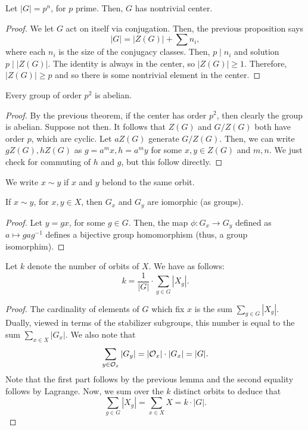 \begin{theorem}
    Let $|G| = p^n$, for $p$ prime. Then, $G$ has nontrivial center.
\end{theorem}
\begin{proof}
    We let $G$ act on itself via conjugation. Then, the previous proposition says
    \[
    |G| = |Z(G)| + \sum n_i,
    \]
    where each $n_i$ is the size of the conjugacy classes. Then, $p \mid n_i$ and solution
    $p \mid |Z(G)|$. The identity is always in the center, so $|Z(G)| \geq 1$. Therefore,
    $|Z(G)| \geq p$ and so there is some nontrivial element in the center.
\end{proof}

\begin{corollary}
    Every group of order $p^2$ is abelian.
\end{corollary}
\begin{proof}
    By the previous theorem, if the center has order $p^2$, then 
    clearly the group is abelian. Suppose not then.
    It follows that $Z(G)$ and $G/Z(G)$ both have order $p$, which
    are cyclic. Let $aZ(G)$ generate $G/Z(G)$. Then, we can write
    $gZ(G), hZ(G)$ as $g = a^mx, h=a^my$ for some $x,y \in Z(G)$ and $m,n$.
    We just check for commuting of $h$ and $g$, but this follow directly.
\end{proof}

\begin{nt}
We write $x \sim y$ if $x$ and $y$ belond to the same orbit.
\end{nt}

\begin{proposition}
    If $x \sim y$, for $x, y \in X$, then $G_x$ and $G_y$ are 
    iomorphic (as groups).
\end{proposition}
\begin{proof}
    Let $y = gx$, for some $g \in G$. Then, the map
    $\phi \colon G_x \rightarrow G_y$ defined as $a \mapsto gag^{-1}$
    defines a bijective group homomorphism (thus, a group isomorphim).
\end{proof}

\begin{theorem}
    Let $k$ denote the number of orbits of $X$. We have as follows:
    \[
    k = \frac{1}{|G|} \cdot \sum_{g \in G} |X_g|.
    \]
\end{theorem}
\begin{proof}
    The cardinality of elements of $G$ which fix $x$ is the sum $\sum_{g \in G} |X_g|$.
    Dually, viewed in terms of the stabilizer subgroups, this number is 
    equal to the sum $\sum_{x \in X} |G_x|$. We also note that
    \[
    \sum_{y \in \mathcal{O}_x} |G_y| = |\mathcal{O}_x| \cdot |G_x| = |G|.
    \]
    Note that the first part follows by the previous lemma and the second
    equality follows by Lagrange. Now, we sum over the $k$ distinct orbits to 
    deduce that
    \[
    \sum_{g \in G} |X_g| = \sum_{x \in X} X = k \cdot |G|.
    \]
\end{proof}


